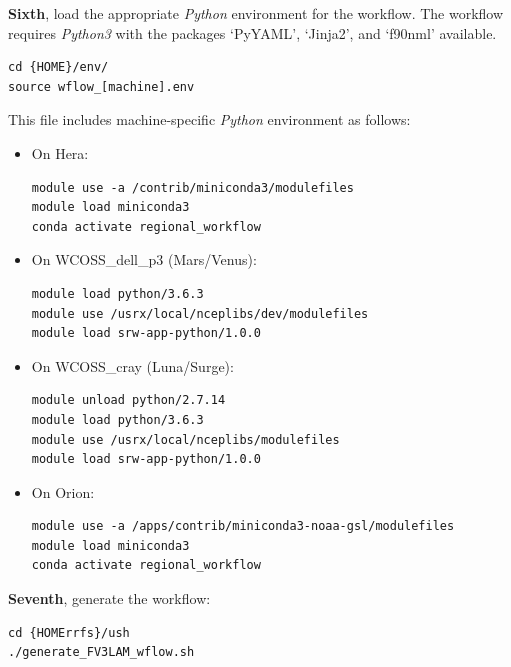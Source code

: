 \documentclass[11pt,fleqn]{report}              %
\begin{document}
 \vspace{0.5cm}

{\bf Sixth}, load the appropriate {\it Python} environment for the workflow. The workflow requires {\it Python3} with the packages `PyYAML', `Jinja2', and `f90nml' available.
\lstset{language=bash}   
\begin{lstlisting}[frame=trBL]
cd {HOME}/env/
source wflow_[machine].env
\end{lstlisting}

This file includes machine-specific {\it Python} environment as follows:
\begin{itemize}
\item On Hera:
\lstset{language=bash}   
\begin{lstlisting}[frame=trBL]
module use -a /contrib/miniconda3/modulefiles
module load miniconda3
conda activate regional_workflow
\end{lstlisting}

\item On WCOSS\_dell\_p3 (Mars/Venus):
\lstset{language=bash}   
\begin{lstlisting}[frame=trBL]
module load python/3.6.3
module use /usrx/local/nceplibs/dev/modulefiles
module load srw-app-python/1.0.0
\end{lstlisting}

\item On WCOSS\_cray (Luna/Surge):
\lstset{language=bash}   
\begin{lstlisting}[frame=trBL]
module unload python/2.7.14
module load python/3.6.3
module use /usrx/local/nceplibs/modulefiles
module load srw-app-python/1.0.0
\end{lstlisting}

\item On Orion:
\lstset{language=bash}   
\begin{lstlisting}[frame=trBL]
module use -a /apps/contrib/miniconda3-noaa-gsl/modulefiles
module load miniconda3
conda activate regional_workflow
\end{lstlisting}

\end{itemize}


\vspace{0.5cm}

{\bf Seventh}, generate the workflow:
\lstset{language=bash}   
\begin{lstlisting}[frame=trBL]
cd {HOMErrfs}/ush
./generate_FV3LAM_wflow.sh
\end{lstlisting}
\end{document}
